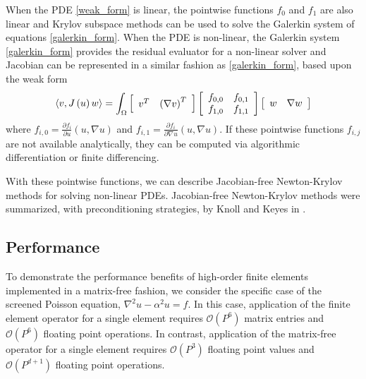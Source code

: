 When the PDE \ref{weak_form} is linear, the pointwise functions $f_0$ and $f_1$ are also linear and Krylov subspace methods can be used to solve the Galerkin system of equations \ref{galerkin_form}.
When the PDE is non-linear, the Galerkin system \ref{galerkin_form} provides the residual evaluator for a non-linear solver and Jacobian can be represented in a similar fashion as \ref{galerkin_form}, based upon the weak form
\begin{equation}
\langle v, J \left( u \right) w \rangle = \int_{\Omega}
\left[ \begin{array}{c c}
v^T & \left( \nabla v \right)^T
\end{array} \right]
\left[ \begin{array}{c c}
f_{0, 0} & f_{0, 1}\\
f_{1, 0} & f_{1, 1}
\end{array} \right]
\left[ \begin{array}{c c}
w & \nabla w
\end{array} \right]
\label{jacobian_form}
\end{equation}
where $f_{i, 0} = \frac{\partial f_i}{\partial u} \left( u, \nabla u \right)$ and $f_{i, 1} = \frac{\partial f_i}{\partial \nabla u} \left( u, \nabla u \right)$.
If these pointwise functions $f_{i, j}$ are not available analytically, they can be computed via algorithmic differentiation or finite differencing.

With these pointwise functions, we can describe Jacobian-free Newton-Krylov methods for solving non-linear PDEs.
Jacobian-free Newton-Krylov methods were summarized, with preconditioning strategies, by Knoll and Keyes in \cite{knoll2004jacobian}.

\subsection{Performance}

To demonstrate the performance benefits of high-order finite elements implemented in a matrix-free fashion, we consider the specific case of the screened Poisson equation, $\nabla^2 u - \alpha^2 u = f$.
In this case, application of the finite element operator for a single element requires $\mathcal{O} \left( P^6 \right)$ matrix entries and $\mathcal{O} \left( P^6 \right)$ floating point operations.
In contrast, application of the matrix-free operator for a single element requires $\mathcal{O} \left( P^3 \right)$ floating point values and $\mathcal{O} \left( P^{d + 1} \right)$ floating point operations.

